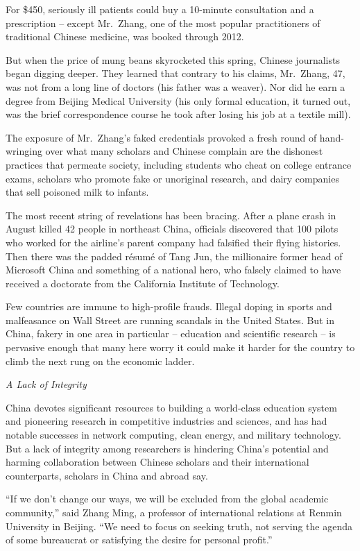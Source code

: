 ﻿\documentclass[12pt]{article}
\begin{document}
For \$450, seriously ill patients could buy a 10-minute consultation and a prescription -- except
Mr.~Zhang, one of the most popular practitioners of traditional Chinese medicine, was booked through
2012.

But when the price of mung beans skyrocketed this spring, Chinese journalists began digging deeper.
They learned that contrary to his claims, Mr.~Zhang, 47, was not from a long line of doctors (his
father was a weaver). Nor did he earn a degree from Beijing Medical University (his only formal
education, it turned out, was the brief correspondence course he took after losing his job at a
textile mill).

The exposure of Mr.~Zhang's faked credentials provoked a fresh round of hand-wringing over what many
scholars and Chinese complain are the dishonest practices that permeate society, including students
who cheat on college entrance exams, scholars who promote fake or unoriginal research, and dairy
companies that sell poisoned milk to infants.

The most recent string of revelations has been bracing. After a plane crash in August killed 42
people in northeast China, officials discovered that 100 pilots who worked for the airline's parent
company had falsified their flying histories. Then there was the padded r\'esum\'e of Tang Jun, the
millionaire former head of Microsoft China and something of a national hero, who falsely claimed to
have received a doctorate from the California Institute of Technology.

Few countries are immune to high-profile frauds. Illegal doping in sports and malfeasance on Wall
Street are running scandals in the United States. But in China, fakery in one area in particular --
education and scientific research -- is pervasive enough that many here worry it could make it
harder for the country to climb the next rung on the economic ladder.

\emph{A Lack of Integrity}

China devotes significant resources to building a world-class education system and pioneering
research in competitive industries and sciences, and has had notable successes in network computing,
clean energy, and military technology. But a lack of integrity among researchers is hindering
China's potential and harming collaboration between Chinese scholars and their international
counterparts, scholars in China and abroad say.

``If we don't change our ways, we will be excluded from the global academic community,'' said Zhang
Ming, a professor of international relations at Renmin University in Beijing. ``We need to focus on
seeking truth, not serving the agenda of some bureaucrat or satisfying the desire for personal
profit.''
\end{document}
